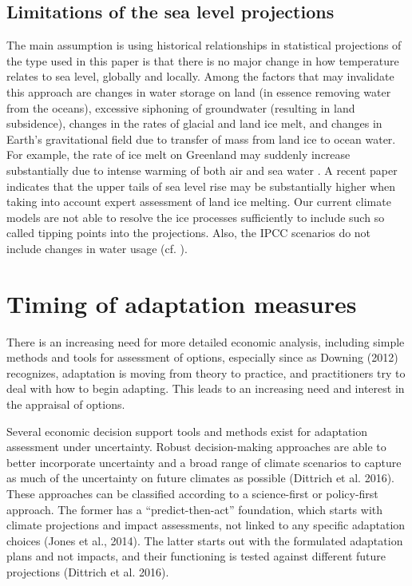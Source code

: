 \documentclass[draft,linenumbers]{agujournal}
\begin{document}
\subsection{Limitations of the sea level projections}
The main assumption is using historical relationships in statistical projections of the type used in this paper is that there is no major change in how temperature relates to sea level, globally and locally. Among the factors that may invalidate this approach are changes in water storage on land (in essence removing water from the oceans), excessive siphoning of groundwater (resulting in land subsidence), changes in the rates of glacial and land ice melt, and changes in Earth's gravitational field due to transfer of mass from land ice to ocean water. For example, the rate of ice melt on Greenland may suddenly increase substantially due to intense warming of both air and sea water \citep{bamber2013}. A recent paper \citep{jevrejeva2016} indicates that the upper tails of sea level rise may be substantially higher when taking into account expert assessment of land ice melting. Our current climate models are not able to resolve the ice processes sufficiently to include such so called tipping points into the projections. Also, the IPCC scenarios \citep{change} do not include changes in water usage (cf. \citet{wada2012}). 

\section{Timing of adaptation measures}
\label{decision_tools_PartI}

There is an increasing need for more detailed economic analysis, including simple methods and tools for assessment of options, especially since as Downing (2012) recognizes, adaptation is moving from theory to practice, and practitioners try to deal with how to begin adapting. This leads to an increasing need and interest in the appraisal of options.

Several economic decision support tools and methods exist for adaptation assessment under uncertainty. Robust decision-making approaches are able to better incorporate uncertainty and a broad range of climate scenarios to capture as much of the uncertainty on future climates as possible (Dittrich et al. 2016). These approaches can be classified according to a science-first or policy-first approach. The former has a ``predict-then-act'' foundation, which starts with climate projections and impact assessments, not linked to any specific adaptation choices (Jones et al., 2014). The latter starts out with the formulated adaptation plans and not impacts, and their functioning is tested against different future projections (Dittrich et al. 2016).
\end{document}
